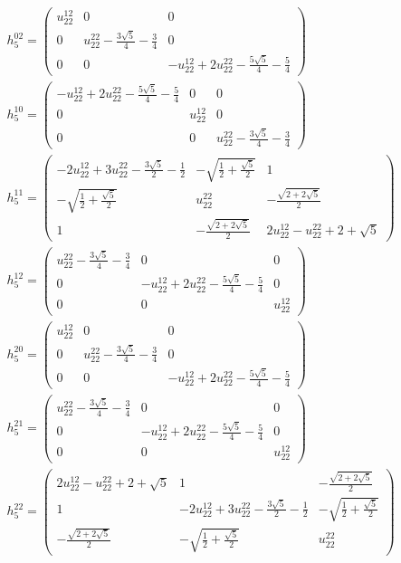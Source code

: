 \documentclass[a4paper, 11pt, twoside, onecolumn]{article}
\begin{document}
\begin{landscape}
\begin{gather*}
	 h_5^{02}=\begin{pmatrix}u^{12}_{22} & 0 & 0\\0 & u^{22}_{22} - \frac{3 \sqrt{5}}{4} - \frac{3}{4} & 0\\0 & 0 & - u^{12}_{22} + 2 u^{22}_{22} - \frac{5 \sqrt{5}}{4} - \frac{5}{4}\end{pmatrix}\\ 
	 h_5^{10}=\begin{pmatrix}- u^{12}_{22} + 2 u^{22}_{22} - \frac{5 \sqrt{5}}{4} - \frac{5}{4} & 0 & 0\\0 & u^{12}_{22} & 0\\0 & 0 & u^{22}_{22} - \frac{3 \sqrt{5}}{4} - \frac{3}{4}\end{pmatrix}\\ 
	 h_5^{11}=\begin{pmatrix}- 2 u^{12}_{22} + 3 u^{22}_{22} - \frac{3 \sqrt{5}}{2} - \frac{1}{2} & - \sqrt{\frac{1}{2} + \frac{\sqrt{5}}{2}} & 1\\- \sqrt{\frac{1}{2} + \frac{\sqrt{5}}{2}} & u^{22}_{22} & - \frac{\sqrt{2 + 2 \sqrt{5}}}{2}\\1 & - \frac{\sqrt{2 + 2 \sqrt{5}}}{2} & 2 u^{12}_{22} - u^{22}_{22} + 2 + \sqrt{5}\end{pmatrix}\\ 
	 h_5^{12}=\begin{pmatrix}u^{22}_{22} - \frac{3 \sqrt{5}}{4} - \frac{3}{4} & 0 & 0\\0 & - u^{12}_{22} + 2 u^{22}_{22} - \frac{5 \sqrt{5}}{4} - \frac{5}{4} & 0\\0 & 0 & u^{12}_{22}\end{pmatrix}\\ 
	 h_5^{20}=\begin{pmatrix}u^{12}_{22} & 0 & 0\\0 & u^{22}_{22} - \frac{3 \sqrt{5}}{4} - \frac{3}{4} & 0\\0 & 0 & - u^{12}_{22} + 2 u^{22}_{22} - \frac{5 \sqrt{5}}{4} - \frac{5}{4}\end{pmatrix}\\ 
	 h_5^{21}=\begin{pmatrix}u^{22}_{22} - \frac{3 \sqrt{5}}{4} - \frac{3}{4} & 0 & 0\\0 & - u^{12}_{22} + 2 u^{22}_{22} - \frac{5 \sqrt{5}}{4} - \frac{5}{4} & 0\\0 & 0 & u^{12}_{22}\end{pmatrix}\\ 
	 h_5^{22}=\begin{pmatrix}2 u^{12}_{22} - u^{22}_{22} + 2 + \sqrt{5} & 1 & - \frac{\sqrt{2 + 2 \sqrt{5}}}{2}\\1 & - 2 u^{12}_{22} + 3 u^{22}_{22} - \frac{3 \sqrt{5}}{2} - \frac{1}{2} & - \sqrt{\frac{1}{2} + \frac{\sqrt{5}}{2}}\\- \frac{\sqrt{2 + 2 \sqrt{5}}}{2} & - \sqrt{\frac{1}{2} + \frac{\sqrt{5}}{2}} & u^{22}_{22}\end{pmatrix}\\ 

\end{gather*}
\end{landscape}
\end{document}
